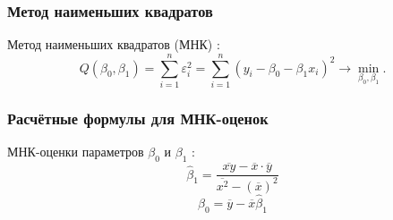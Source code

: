 \documentclass[12pt]{article}
\begin{document}
\begin{flushleft}
    \subsubsection{Метод наименьших квадратов}
    Метод наименьших квадратов (МНК) \cite{theory}:
    \begin{equation}
        Q(\beta_0, \beta_1) = \sum_{i = 1}^{n}\varepsilon_{i}^{2} = \sum_{i = 1}^{n}(y_i - \beta_0 - \beta_1x_i)^2 \rightarrow \min_{\beta_0, \beta_1}.
    \end{equation}

    \subsubsection{Расчётные формулы для МНК-оценок}
    МНК-оценки параметров $\beta_0$ и $\beta_1$ \cite{theory}:
    \begin{equation}
        \hat{\beta}_1 = \frac{\overline{xy} - \overline{x} \cdot \overline{y}}{\overline{x^2} - (\overline{x})^2}
        \label{mnk1}
    \end{equation}
    \begin{equation}
        \hat{\beta}_0 = \overline{y} - \overline{x}\hat{\beta}_1
        \label{mnk0}
    \end{equation}


\end{flushleft}
\end{document}
